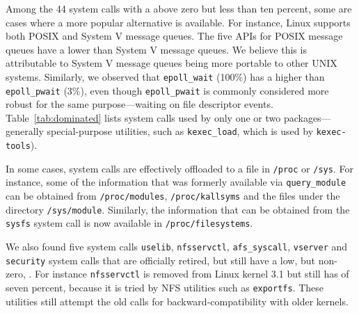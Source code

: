 
Among the 44 system calls with a \usagemetric{} above zero but less than ten percent,
some are cases where a more popular alternative is available.
For instance, Linux supports both POSIX and System V message queues.
The five APIs for POSIX message queues have a lower
\usagemetric{} than System V message queues.
We believe this is attributable to System V message queues %
being more portable to other UNIX systems.
Similarly, we observed that {\tt epoll\_wait} (100\%) has a higher \usagemetric{} than {\tt epoll\_pwait} (3\%),
even though {\tt epoll\_pwait} is commonly considered more robust
for the same purpose---waiting on file descriptor events.
Table~\ref{tab:dominated} lists
system calls used by only one or two packages---generally special-purpose utilities,
such as {\tt kexec\_load}, which is used by {\tt kexec-tools}).




In some cases, system calls are effectively offloaded to a file in {\tt /proc} or {\tt /sys}.
For instance, some of the information that was formerly available via 
{\tt query\_module} can be obtained from {\tt /proc/modules}, {\tt /proc/kallsyms} 
and the files under the directory {\tt /sys/module}. Similarly, the information that can be obtained from the {\tt sysfs} system call
is now available in {\tt /proc/filesystems}.


We also found five system calls {\tt uselib}, {\tt nfsservctl}, {\tt afs\_syscall}, {\tt vserver} and {\tt security} system calls that are officially retired, but still have a low, but non-zero, \usagemetric{}. 
For instance {\tt nfsservctl} is removed from Linux kernel 3.1 but
still has \usagemetric{} of seven percent,  %
because it is tried by NFS utilities such as {\tt exportfs}.
These utilities still attempt the old calls for backward-compatibility with older kernels.


